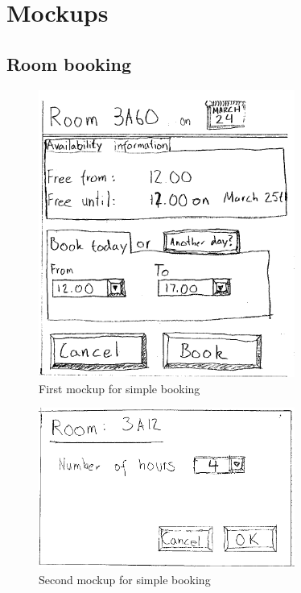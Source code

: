 \pagebreak

\section{Mockups} 
\label{app:mockups}

\subsection{Room booking}

\begin{figure}
\begin{center}
\leavevmode
\includegraphics[width=0.75\textwidth]{images/bookRoomMockup}
\end{center}
\caption{First mockup for simple booking}
\label{fig:app1_mock1_1}
\end{figure}

\begin{figure}
\begin{center}
\leavevmode
\includegraphics[width=0.75\textwidth]{images/bookRoomMockup2}
\end{center}
\caption{Second mockup for simple booking}
\label{fig:app1_mock1_2}
\end{figure}

